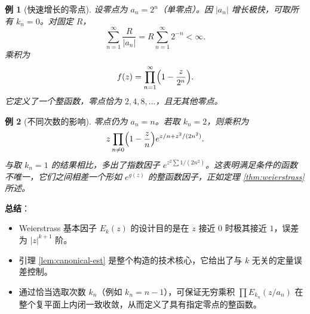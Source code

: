 \documentclass[UTF8]{ctexart}
\newtheorem{example}{例}[section]
\numberwithin{equation}{section}
\begin{document}
\begin{example}[快速增长的零点]
设零点为 \(a_n = 2^n\)（单零点）。因 \(|a_n|\) 增长极快，可取所有 \(k_n = 0\)。对固定 \(R\)，
\[
\sum_{n=1}^\infty \frac{R}{|a_n|} = R \sum_{n=1}^\infty 2^{-n} < \infty.
\]
乘积为
\[
f(z) = \prod_{n=1}^\infty \Bigl( 1 - \frac{z}{2^n} \Bigr).
\]
它定义了一个整函数，零点恰为 \(2, 4, 8, \dots\)，且无其他零点。
\end{example}

\begin{example}[不同次数的影响]
零点仍为 \(a_n = n\)。若取 \(k_n = 2\)，则乘积为
\[
z \prod_{n \neq 0} \Bigl( 1 - \frac{z}{n} \Bigr) e^{z/n + z^2/(2n^2)}.
\]
与取 \(k_n = 1\) 的结果相比，多出了指数因子 \(e^{z^2 \sum 1/(2n^2)}\)。这表明满足条件的函数不唯一，它们之间相差一个形如 \(e^{g(z)}\) 的整函数因子，正如定理 \ref{thm:weierstrass} 所述。
\end{example}

\textbf{总结}：
\begin{itemize}
\item Weierstrass 基本因子 \(E_k(z)\) 的设计目的是在 \(z\) 接近 \(0\) 时极其接近 \(1\)，误差为 \(|z|^{k+1}\) 阶。
\item 引理 \ref{lem:canonical-est} 是整个构造的技术核心，它给出了与 \(k\) 无关的定量误差控制。
\item 通过恰当选取次数 \(k_n\)（例如 \(k_n = n-1\)），可保证无穷乘积 \(\prod E_{k_n}(z/a_n)\) 在整个复平面上内闭一致收敛，从而定义了具有指定零点的整函数。
\end{itemize}
\end{document}
